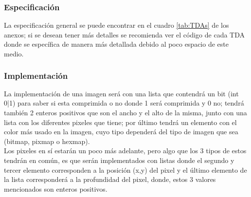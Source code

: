   \subsubsection{Especificación}
    La especificación general se puede encontrar en el cuadro \ref{tab:TDAs} de los anexos;
    si se desean tener más detalles se recomienda ver el código de cada TDA donde se específica
    de manera más detallada debido al poco espacio de este medio.

  \subsubsection{Implementación}
    La implementación de una imagen será con una lista que contendrá un bit (int 0|1) para saber si esta comprimida o no
    donde 1 será comprimida y 0 no; tendrá también 2 enteros positivos que son el ancho y el alto de la misma, junto
    con una lista con los diferentes pixeles que tiene; por último tendrá un elemento con el color más
    usado en la imagen, cuyo tipo dependerá del tipo de imagen que sea (bitmap, pixmap o hexmap).\\

    Los pixeles en sí estarán un poco más adelante, pero algo que los 3 tipos de estos tendrán en común, es que serán implementados con listas 
    donde el segundo y tercer elemento corresponden a la posición (x,y) del pixel y el último elemento de la lista
    corresponderá a la profundidad del pixel, donde, estos 3 valores mencionados son enteros positivos.\\

